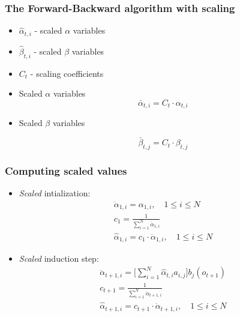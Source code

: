 \documentclass{beamer}
\begin{document}
\begin{frame}
  \frametitle{The Forward-Backward algorithm with scaling}
  \begin{itemize}
  \item $\hat{\alpha}_{t,i}$ - scaled $\alpha$ variables
  \item $\hat{\beta}_{t,i}$ - scaled $\beta$ variables \vspace*{1em}
  \item $C_t$ - scaling coefficients \vspace*{1em}
  \item Scaled $\alpha$ variables
    \begin{equation}
      \label{eq:scaled-alpha}
      \bar{\alpha}_{t,i} = C_t \cdot \alpha_{t,i}
    \end{equation}
  \item Scaled $\beta$ variables
    
    \begin{equation}
      \label{eq:scaled-beta}
      \bar{\beta}_{t,j} = C_t \cdot \beta_{t,j}
    \end{equation}
  \end{itemize}
\end{frame}

\begin{frame}
  \frametitle{Computing scaled values}
  \begin{itemize}
  \item \emph{Scaled} intialization:
    \begin{align}
      \ddot{\alpha}_{1,i} = \alpha_{1,i},\quad 1 \le i \le N \\
      c_1 = \frac{1}{\displaystyle\sum_{i=1}^{N} \ddot{\alpha}_{1,i}} \\
      \hat{\alpha}_{1,i} = c_1 \cdot \ddot{\alpha}_{1,i}, \quad 1 \le
      i \le N
    \end{align}
    \pause
    \vspace*{-.5em}
  \item \emph{Scaled} induction step:
    \begin{align}
      \ddot{\alpha}_{t+1,i} = \Big[
      \displaystyle\sum_{i=1}^{N}\hat{\alpha}_{t,i}a_{i,j}\Big]
      b_{j}(o_{t+1}) \\
      c_{t+1} = \frac{1}{\displaystyle\sum_{i=1}^{N} \ddot{\alpha}_{t+1,i}} \\
      \hat{\alpha}_{t+1,i} = c_{t+1} \cdot \ddot{\alpha}_{t+1,i},
      \quad 1 \le i \le N
    \end{align}
  \end{itemize}

\end{frame}
\end{document}

